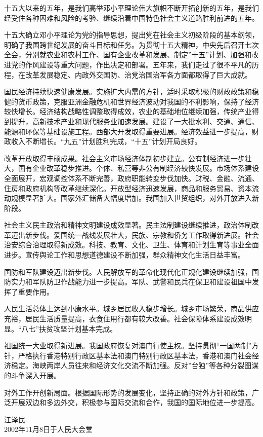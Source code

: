 \documentclass{njuthesis}
\begin{document}
%
\begin{preface}

十五大以来的五年，是我们高举邓小平理论伟大旗帜不断开拓创新的五年，是我们经受住各种困难和风险的考验、继续沿着中国特色社会主义道路胜利前进的五年。 

十五大确立邓小平理论为党的指导思想，提出党在社会主义初级阶段的基本纲领，明确了我国跨世纪发展的奋斗目标和任务。为贯彻十五大精神，中央先后召开七次全会，分别就农业和农村工作、国有企业改革和发展、制定”十五”计划、加强和改进党的作风建设等重大问题，作出决定和部署。五年来，我们走过了很不平凡的历程，在改革发展稳定、内政外交国防、治党治国治军各方面都取得了巨大成就。 

国民经济持续快速健康发展。实施扩大内需的方针，适时采取积极的财政政策和稳健的货币政策，克服亚洲金融危机和世界经济波动对我国的不利影响，保持了经济较快增长。经济结构战略性调整取得成效，农业的基础地位继续加强，传统产业得到提升，高新技术产业和现代服务业加速发展。建设了一大批水利、交通、通信、能源和环保等基础设施工程。西部大开发取得重要进展。经济效益进一步提高，财政收入不断增长。“九五”计划胜利完成，“十五”计划开局良好。 

改革开放取得丰硕成果。社会主义市场经济体制初步建立。公有制经济进一步壮大，国有企业改革稳步推进。个体、私营等非公有制经济较快发展。市场体系建设全面展开，宏观调控体系不断完善，政府职能转变步伐加快。财税、金融、流通、住房和政府机构等改革继续深化。开放型经济迅速发展，商品和服务贸易、资本流动规模显著扩大。国家外汇储备大幅度增加。我国加入世贸组织，对外开放进入新阶段。 

社会主义民主政治和精神文明建设成效显著。民主法制建设继续推进，政治体制改革迈出新步伐。爱国统一战线发展壮大，民族、宗教和侨务工作取得新进展。社会治安综合治理取得新成效。科技、教育、文化、卫生、体育和计划生育等事业全面进步。宣传舆论工作和思想道德建设不断加强，群众精神文化生活日益丰富。 

国防和军队建设迈出新步伐。人民解放军的革命化现代化正规化建设继续加强，国防实力和军队防卫作战能力进一步提高。军队、武警和民兵在保卫和建设祖国中发挥了重要作用。 

人民生活总体上达到小康水平。城乡居民收入稳步增长。城乡市场繁荣，商品供应充裕，居民生活质量提高，衣食住用行都有较大改善。社会保障体系建设成效明显。“八七”扶贫攻坚计划基本完成。 

祖国统一大业取得新进展。我国政府恢复对澳门行使主权。坚持贯彻“一国两制”方针，严格执行香港特别行政区基本法和澳门特别行政区基本法，香港和澳门社会经济稳定。海峡两岸人员往来和经济文化交流不断加强。反对”台独”等各种分裂图谋的斗争深入开展。 

对外工作开创新局面。根据国际形势的发展变化，坚持正确的对外方针和政策，广泛开展双边和多边外交，积极参与国际交流和合作，我国的国际地位进一步提高。 

\vspace{1cm}
\begin{flushright}
江泽民\\
2002年11月8日于人民大会堂
\end{flushright}

\end{preface}
\end{document}
